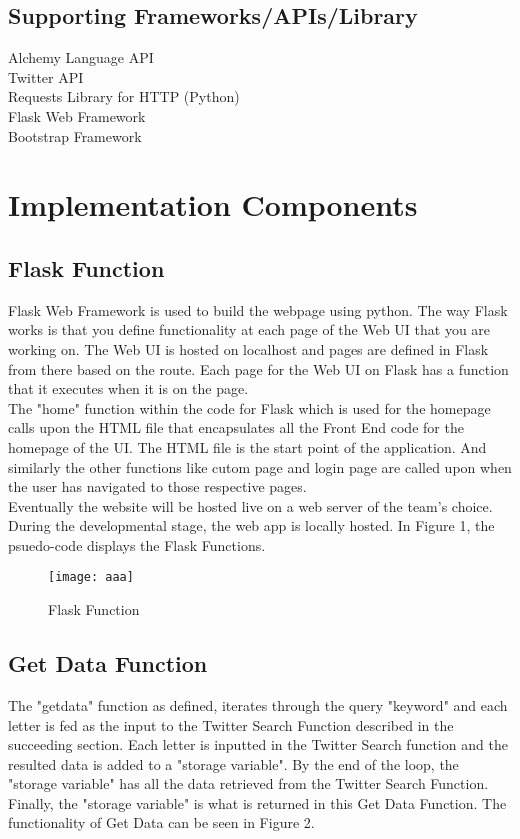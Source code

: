 \documentclass[12pt, titlepage]{article}
\begin{document}
\subsection{Supporting Frameworks/APIs/Library}
Alchemy Language API\\
Twitter API\\
Requests Library for HTTP (Python)\\
Flask Web Framework\\
Bootstrap Framework

\newpage
\section{Implementation Components}
\subsection{Flask Function}
Flask Web Framework is used to build the webpage using python. The way Flask works is that you define functionality at each page of the Web UI that you are working on. The Web UI is hosted on localhost and pages are defined in Flask from there based on the route. Each page for the Web UI on Flask has a function that it executes when it is on the page. \\
The "home" function within the code for Flask which is used for the homepage calls upon the HTML file that encapsulates all the Front End code for the homepage of the UI. The HTML file is the start point of the application. And similarly the other functions like cutom page and login page are called upon when the user has navigated to those respective pages. \\
Eventually the website will be hosted live on a web server of the team's choice. During the developmental stage, the web app is locally hosted. In Figure 1, the psuedo-code displays the Flask Functions.


\begin{figure}[H]
\centering
\texttt{[image: aaa]}
\caption{Flask Function}
\label{fig:Flask}
\end{figure}


\subsection{Get Data Function}
The "getdata" function as defined, iterates through the query "keyword" and each letter is fed as the input to the Twitter Search Function described in the succeeding section. Each letter is inputted in the Twitter Search function and the resulted data is added to a "storage variable". By the end of the loop, the "storage variable" has all the data retrieved from the Twitter Search Function. Finally, the "storage variable" is what is returned in this Get Data Function. The functionality of Get Data can be seen in Figure 2.
\end{document}
